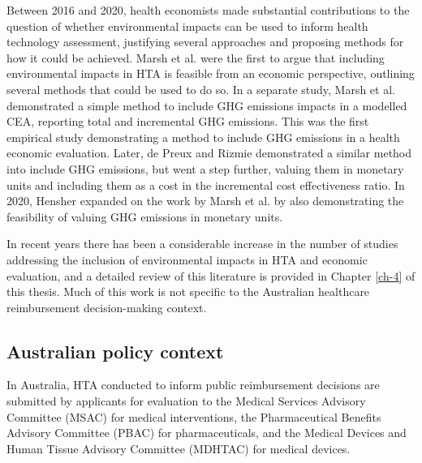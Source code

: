 \begin{refsection}
Between 2016 and 2020, health economists made substantial contributions to the question of whether environmental impacts can be used to inform health technology assessment, justifying several approaches and proposing methods for how it could be achieved. Marsh et al. were the first to argue that including environmental impacts in HTA is feasible from an economic perspective, outlining several methods that could be used to do so.\cite{marsh_expanding_2016} In a separate study, Marsh et al. demonstrated a simple method to include GHG emissions impacts in a modelled CEA, reporting total and incremental GHG emissions.\cite{marsh_incorporating_2016} This was the first empirical study demonstrating a method to include GHG emissions in a health economic evaluation. Later, de Preux and Rizmie demonstrated a similar method into include GHG emissions, but went a step further, valuing them in monetary units and including them as a cost in the incremental cost effectiveness ratio.\cite{de_preux_beyond_2018} In 2020, Hensher expanded on the work by Marsh et al. by also demonstrating the feasibility of valuing GHG emissions in monetary units.\cite{hensher_incorporating_2020}

In recent years there has been a considerable increase in the number of studies addressing the inclusion of environmental impacts in HTA and economic evaluation,\cite{polisena_environmental_2018, pinho-gomes_incorporating_2022, guirado-fuentes_main_2023, desterbecq_inclusion_2023, antonazzo_health_2025} and a detailed review of this literature is provided in Chapter \ref{ch-4} of this thesis. Much of this work is not specific to the Australian healthcare reimbursement decision-making context. 

\subsection{Australian policy context}
In Australia, HTA conducted to inform public reimbursement decisions are submitted by applicants for evaluation to the Medical Services Advisory Committee (MSAC) for medical interventions, the Pharmaceutical Benefits Advisory Committee (PBAC) for pharmaceuticals, and the Medical Devices and Human Tissue Advisory Committee (MDHTAC) for medical devices.


\end{refsection}
